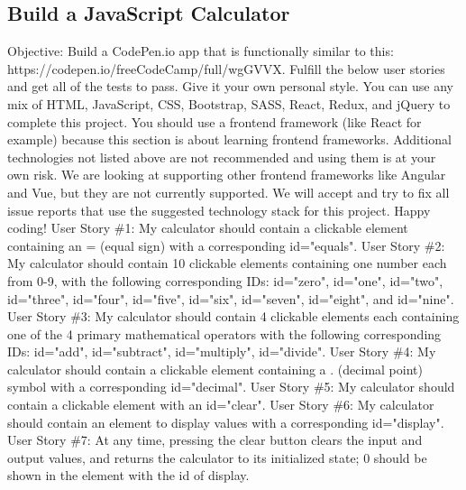 \documentclass{article}%
\begin{document}
%
\subsection{Build a JavaScript Calculator}%
\label{subsec:BuildaJavaScriptCalculator}%
Objective: Build a CodePen.io app that is functionally similar to this: https://codepen.io/freeCodeCamp/full/wgGVVX.\newline%
Fulfill the below user stories and get all of the tests to pass. Give it your own personal style.\newline%
You can use any mix of HTML, JavaScript, CSS, Bootstrap, SASS, React, Redux, and jQuery to complete this project. You should use a frontend framework (like React for example) because this section is about learning frontend frameworks. Additional technologies not listed above are not recommended and using them is at your own risk. We are looking at supporting other frontend frameworks like Angular and Vue, but they are not currently supported. We will accept and try to fix all issue reports that use the suggested technology stack for this project. Happy coding!\newline%
User Story \#1: My calculator should contain a clickable element containing an = (equal sign) with a corresponding id="equals".\newline%
User Story \#2: My calculator should contain 10 clickable elements containing one number each from 0{-}9, with the following corresponding IDs: id="zero", id="one", id="two", id="three", id="four", id="five", id="six", id="seven", id="eight", and id="nine".\newline%
User Story \#3: My calculator should contain 4 clickable elements each containing one of the 4 primary mathematical operators with the following corresponding IDs: id="add", id="subtract", id="multiply", id="divide".\newline%
User Story \#4: My calculator should contain a clickable element containing a . (decimal point) symbol with a corresponding id="decimal".\newline%
User Story \#5: My calculator should contain a clickable element with an id="clear".\newline%
User Story \#6: My calculator should contain an element to display values with a corresponding id="display".\newline%
User Story \#7: At any time, pressing the clear button clears the input and output values, and returns the calculator to its initialized state; 0 should be shown in the element with the id of display.\newline%
\end{document}
